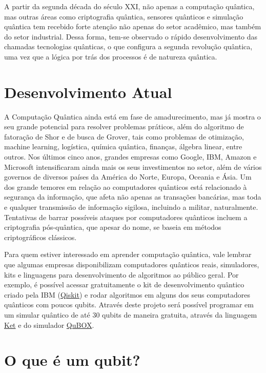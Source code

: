 A partir da segunda década do século XXI, não apenas a computação
quântica, mas outras áreas como criptografia quântica, sensores
quânticos e simulação quântica tem recebido forte atenção não apenas do
setor acadêmico, mas também do setor industrial.
Dessa forma, tem-se observado o rápido desenvolvimento das chamadas tecnologias quânticas, o
que configura a segunda revolução quântica, uma vez que a lógica por
trás dos processos é de natureza quântica.

\section{Desenvolvimento Atual}\label{sec:desenvolvimento-atual}

A Computação Quântica ainda está em fase de amadurecimento, mas já
mostra o seu grande potencial para resolver problemas práticos, além do
algoritmo de fatoração de Shor e de busca de Grover, tais como problemas
de otimização, machine learning, logística, química quântica, finanças,
álgebra linear, entre outros.
Nos últimos cinco anos, grandes empresas como Google, IBM, Amazon e Microsoft intensificaram ainda mais os seus investimentos no setor, além de vários governos de diversos países da
América do Norte, Europa, Oceania e Ásia.
Um dos grande temores em relação ao computadores quânticos está relacionado à segurança da
informação, que afeta não apenas as transações bancárias, mas toda e
qualquer transmissão de informação sigilosa, incluindo a militar,
naturalmente.
Tentativas de barrar possíveis ataques por computadores
quânticos incluem a criptografia pós-quântica, que apesar do nome, se
baseia em métodos criptográficos clássicos.

Para quem estiver interessado em aprender computação quântica, vale
lembrar que algumas empresas disponibilizam computadores quânticos
reais, simuladores, kits e linguagens para desenvolvimento de algoritmos
ao público geral.
Por exemplo, é possível acessar gratuitamente o kit de desenvolvimento quântico criado pela IBM
(\href{https://qiskit.org/}{Qiskit}) e rodar algoritmos em alguns dos
seus computadores quânticos com poucos qubits.
Através deste projeto será possível programar em um simular quântico de até 30 qubits de
maneira gratuita, através da linguagem
\href{https://quantumket.org/}{Ket} e do simulador
\href{https://qubox.ufsc.br/qubox.html}{QuBOX}.

\section{O que é um qubit?}\label{sec:qubit}

